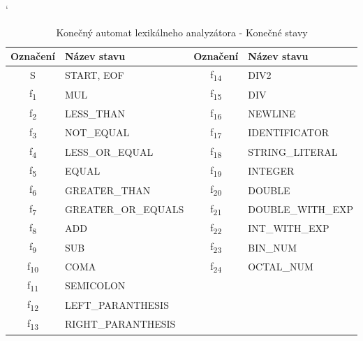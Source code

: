 \documentclass[a4paper, 12pt]{article}
\begin{document}
\begin{table}[!ht]
{
	\renewcommand{\arraystretch}{1.3}
	\begin{center}
		\catcode`
		\begin{tabular}{| c | l | c | l |} 
		\hline
		\textbf{Označení}   & \textbf{Název stavu}             & \textbf{Označení}   & \textbf{Název stavu}  \\ \hline
		S                   & START, EOF                       & f\textsubscript{14} & DIV2     			 \\ \hline
		f\textsubscript{1}  & MUL                              & f\textsubscript{15} & DIV                   \\ \hline
		f\textsubscript{2}  & LESS\_THAN                       & f\textsubscript{16} & NEWLINE         		 \\ \hline
		f\textsubscript{3}  & NOT\_EQUAL                       & f\textsubscript{17} & IDENTIFICATOR   		 \\ \hline
		f\textsubscript{4}  & LESS\_OR\_EQUAL                  & f\textsubscript{18} & STRING\_LITERAL 		 \\ \hline
		f\textsubscript{5}  & EQUAL                            & f\textsubscript{19} & INTEGER         		 \\ \hline
		f\textsubscript{6}  & GREATER\_THAN                    & f\textsubscript{20} & DOUBLE          		 \\ \hline
		f\textsubscript{7}  & GREATER\_OR\_EQUALS              & f\textsubscript{21} & DOUBLE\_WITH\_EXP 	 \\ \hline
		f\textsubscript{8}  & ADD                              & f\textsubscript{22} & INT\_WITH\_EXP 		 \\ \hline
		f\textsubscript{9}  & SUB                              & f\textsubscript{23} & BIN\_NUM 			 \\ \hline
		f\textsubscript{10} & COMA                             & f\textsubscript{24} & 	OCTAL\_NUM	   		 \\ \hline
		f\textsubscript{11} & SEMICOLON                        & 			     	 & 			             \\ \hline
		f\textsubscript{12} & LEFT\_PARANTHESIS     		   & 			         & 	     				 \\ \hline
		f\textsubscript{13} & RIGHT\_PARANTHESIS    		   & 			         & 			 			 \\ \hline
		\end{tabular}
	\caption{Konečný automat lexikálneho analyzátora - Konečné stavy}	
	\end{center}
}  
\end{table}
\clearpage
\newpage
\end{document}
